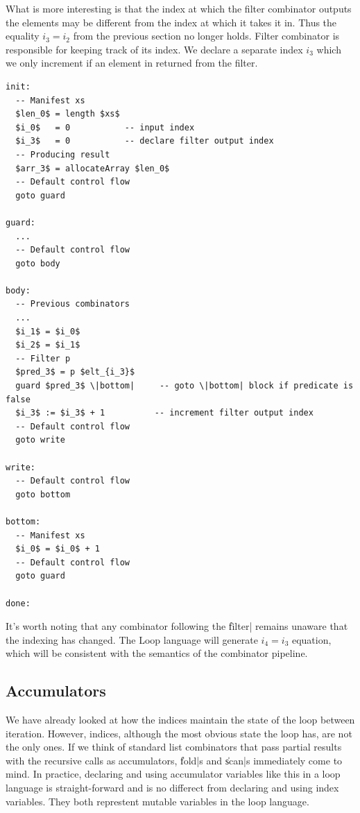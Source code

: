 \documentclass[preamble.tex]{subfiles}
\begin{document}
What is more interesting is that the index at which the filter combinator outputs the elements may be different from the index at which it takes it in. Thus the equality $i_3 = i_2$ from the previous section no longer holds. Filter combinator is responsible for keeping track of its index. We declare a separate index $i_3$ which we only increment if an element in returned from the filter.

\begin{lstlisting}[mathescape]
init:
  -- Manifest xs
  $len_0$ = length $xs$
  $i_0$   = 0           -- input index
  $i_3$   = 0           -- declare filter output index
  -- Producing result
  $arr_3$ = allocateArray $len_0$
  -- Default control flow
  goto guard

guard:
  ...
  -- Default control flow
  goto body

body:
  -- Previous combinators
  ...
  $i_1$ = $i_0$
  $i_2$ = $i_1$
  -- Filter p
  $pred_3$ = p $elt_{i_3}$
  guard $pred_3$ \|bottom|     -- goto \|bottom| block if predicate is false
  $i_3$ := $i_3$ + 1          -- increment filter output index
  -- Default control flow
  goto write

write:
  -- Default control flow
  goto bottom

bottom:
  -- Manifest xs
  $i_0$ = $i_0$ + 1
  -- Default control flow
  goto guard

done:

\end{lstlisting}


It's worth noting that any combinator following the \|filter| remains unaware that the indexing has changed. The Loop language will generate $i_4 = i_3$ equation, which will be consistent with the semantics of the combinator pipeline.



\subsection{Accumulators}

We have already looked at how the indices maintain the state of the loop between iteration. However, indices, although the most obvious state the loop has, are not the only ones. If we think of standard list combinators that pass partial results with the recursive calls as accumulators, \|fold|s and \|scan|s immediately come to mind. In practice, declaring and using accumulator variables like this in a loop language is straight-forward and is no differect from declaring and using index variables. They both represtent mutable variables in the loop language.
\end{document}
